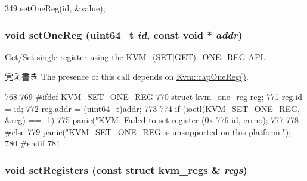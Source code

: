 \begin{DoxyCode}
349 { setOneReg(id, &value); }
\end{DoxyCode}
\hypertarget{classBaseKvmCPU_ad96695f9596f808056054f3c2026b818}{
\subsubsection[{setOneReg}]{\setlength{\rightskip}{0pt plus 5cm}void setOneReg (uint64\_\-t {\em id}, \/  const void $\ast$ {\em addr})}}
\label{classBaseKvmCPU_ad96695f9596f808056054f3c2026b818}
Get/Set single register using the KVM\_\-(SET$|$GET)\_\-ONE\_\-REG API.

\begin{DoxyNote}{覚え書き}
The presence of this call depends on \hyperlink{classKvm_af1ad3b73711f45008bcb240d012987f7}{Kvm::capOneReg()}. 
\end{DoxyNote}



\begin{DoxyCode}
768 {
769 #ifdef KVM_SET_ONE_REG
770     struct kvm_one_reg reg;
771     reg.id = id;
772     reg.addr = (uint64_t)addr;
773 
774     if (ioctl(KVM_SET_ONE_REG, &reg) == -1) {
775         panic("KVM: Failed to set register (0x%
776               id, errno);
777     }
778 #else
779     panic("KVM_SET_ONE_REG is unsupported on this platform.\n");
780 #endif
781 }
\end{DoxyCode}
\hypertarget{classBaseKvmCPU_a104d34588afdf9e14607bad09f01bd53}{
\subsubsection[{setRegisters}]{\setlength{\rightskip}{0pt plus 5cm}void setRegisters (const struct kvm\_\-regs \& {\em regs})}}
\label{classBaseKvmCPU_a104d34588afdf9e14607bad09f01bd53}



